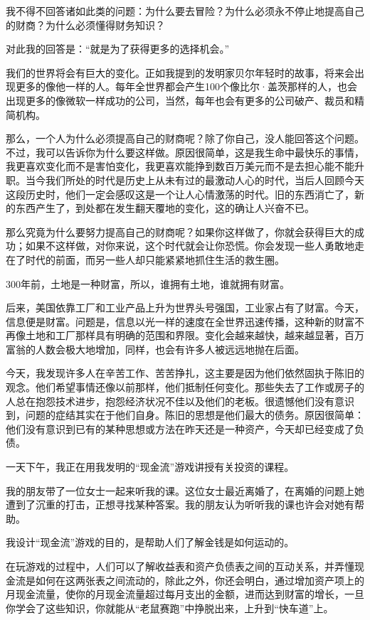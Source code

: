 我不得不回答诸如此类的问题：为什么要去冒险？为什么必须永不停止地提高自己的财商？为什么必须懂得财务知识？

对此我的回答是：“就是为了获得更多的选择机会。”

我们的世界将会有巨大的变化。正如我提到的发明家贝尔年轻时的故事，将来会出现更多的像他一样的人。每年全世界都会产生100个像比尔·盖茨那样的人，也会出现更多的像微软一样成功的公司，当然，每年也会有更多的公司破产、裁员和精简机构。

那么，一个人为什么必须提高自己的财商呢？除了你自己，没人能回答这个问题。不过，我可以告诉你为什么要这样做。原因很简单，这是我生命中最快乐的事情，我更喜欢变化而不是害怕变化，我更喜欢能挣到数百万美元而不是去担心能不能升职。当今我们所处的时代是历史上从未有过的最激动人心的时代，当后人回顾今天这段历史时，他们一定会感叹这是一个让人心情激荡的时代。旧的东西消亡了，新的东西产生了，到处都在发生翻天覆地的变化，这的确让人兴奋不已。

那么究竟为什么要努力提高自己的财商呢？如果你这样做了，你就会获得巨大的成功；如果不这样做，对你来说，这个时代就会让你恐慌。你会发现一些人勇敢地走在了时代的前面，而另一些人却只能紧紧地抓住生活的救生圈。

300年前，土地是一种财富，所以，谁拥有土地，谁就拥有财富。

后来，美国依靠工厂和工业产品上升为世界头号强国，工业家占有了财富。今天，信息便是财富。问题是，信息以光一样的速度在全世界迅速传播，这种新的财富不再像土地和工厂那样具有明确的范围和界限。变化会越来越快，越来越显著，百万富翁的人数会极大地增加，同样，也会有许多人被远远地抛在后面。

今天，我发现许多人在辛苦工作、苦苦挣扎，这主要是因为他们依然固执于陈旧的观念。他们希望事情还像以前那样，他们抵制任何变化。那些失去了工作或房子的人总在抱怨技术进步，抱怨经济状况不佳以及他们的老板。很遗憾他们没有意识到，问题的症结其实在于他们自身。陈旧的思想是他们最大的债务。原因很简单：他们没有意识到已有的某种思想或方法在昨天还是一种资产，今天却已经变成了负债。

一天下午，我正在用我发明的“现金流”游戏讲授有关投资的课程。

我的朋友带了一位女士一起来听我的课。这位女士最近离婚了，在离婚的问题上她遭到了沉重的打击，正想寻找某种答案。我的朋友认为听听我的课也许会对她有帮助。

我设计“现金流”游戏的目的，是帮助人们了解金钱是如何运动的。

在玩游戏的过程中，人们可以了解收益表和资产负债表之间的互动关系，并弄懂现金流是如何在这两张表之间流动的，除此之外，你还会明白，通过增加资产项上的月现金流量，使你的月现金流量超过每月支出的金额，进而达到财富的增长，一旦你学会了这些知识，你就能从“老鼠赛跑”中挣脱出来，上升到“快车道”上。

